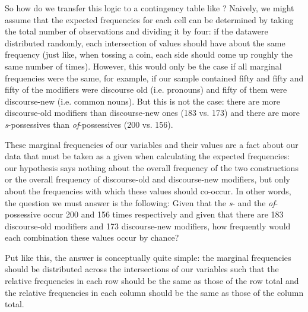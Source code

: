 So how do we transfer this logic to a contingency  table like ? Naively, we might assume that the expected  frequencies for each cell can be determined by taking the total number of observations and dividing it by four: if the data\linebreak were distributed  randomly,  each intersection of values should have about the same frequency (just like, when tossing a coin, each side should come up roughly the same number of times). However, this would only be the case if all marginal frequencies  were the same, for example, if our sample contained fifty   and fifty  and fifty of the modifiers were discourse old (i.e. pronouns)  and fifty of them were discourse\hyp{}new (i.e. common nouns).  But this is not the case: there are more discourse\hyp{}old modifiers than discourse\hyp{}new ones (183 vs. 173) and there are more \textit{s}-possessives than \textit{of}-possessives (200 vs. 156).

These marginal frequencies of our variables and their values are a fact about our data that must be taken as a given when calculating the expected  frequencies: our hypothesis  says nothing about the overall frequency of the two constructions or the overall frequency  of discourse\hyp{}old and discourse\hyp{}new modifiers, but only about the frequencies with which these values should co\hyp{}occur. In other words, the question we must answer is the following: Given that the \textit{s}- and the \textit{of}-possessive  occur 200 and 156 times respectively and given that there are 183 discourse\hyp{}old modifiers and 173 discourse\hyp{}new modifiers, how frequently would each combination these values occur by  chance?

Put like this, the answer is conceptually quite simple: the marginal frequencies should be distributed  across the intersections of our variables such that the relative frequencies  in each row should be the same as those of the row total and the relative frequencies in each column should be the same as those of the column total.

